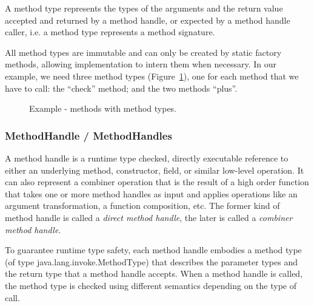 \documentclass{sig-alternate}
\begin{document}
      A method type represents the types of the arguments and the return value accepted and returned by a method handle,
      or expected by a method handle caller, i.e. a method type represents a method signature.

      All method types are immutable and can only be created by static factory methods,
      allowing implementation to intern them when necessary. 
      In our example, we need three method types (Figure~\ref{fooMTS}), one for each method that we have to call:
      the ``check'' method; and the two methods ``plus''.

      \begin{figure}[!ht]
        \centering \vspace{-1.5em}
        \caption{Example - methods with method types.}\vspace{-1em}
        \label{fooMTS}
      \end{figure}

    \subsubsection{MethodHandle / MethodHandles}
      \label{MH}

      A method handle is a runtime type checked, directly executable reference to
      either an underlying method, constructor, field, or similar low-level operation.
      It can also represent a combiner operation that is the result of a high order function
      that takes one or more method handles as input and applies operations like an argument transformation,
      a function composition, etc.
      The former kind of method handle is called a {\it direct method handle},
      the later is called a {\it combiner method handle}.

      To guarantee runtime type safety, each method handle embodies a method type (of type java.lang.invoke.MethodType)
      that describes the parameter types and the return type that a method handle accepts.
      When a method handle is called, the method type is checked using different semantics depending on the
      type of call.
\end{document}
